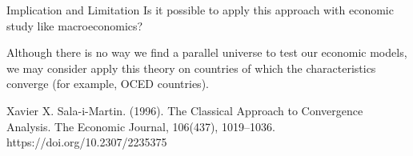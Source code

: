 \begin{frame}{Implication and Limitation}
    Is it possible to apply this approach with economic study like macroeconomics?

    Although there is no way we find a parallel universe to test our economic models, we may consider apply this theory on countries of which the characteristics converge (for example, OCED countries).

    Xavier X. Sala-i-Martin. (1996). The Classical Approach to Convergence Analysis. The Economic Journal, 106(437), 1019–1036. https://doi.org/10.2307/2235375
\end{frame}